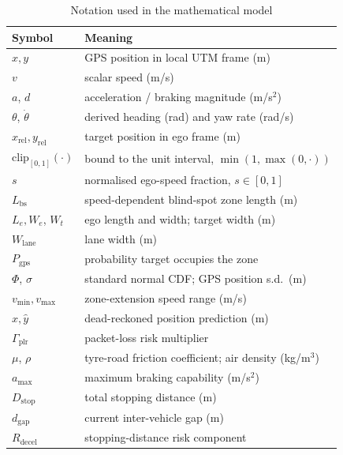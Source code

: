 \documentclass[sn-mathphys-num,Numbered,iicol]{sn-jnl}
\begin{document}
\begin{table}[htbp]
  \caption{Notation used in the mathematical model}
  \label{tab:notation}
  \renewcommand{\arraystretch}{1.12}
  \begin{tabular}{@{}ll@{}}
    \toprule
    \textbf{Symbol} & \textbf{Meaning} \\
    \midrule
    $x, y$                     & GPS position in local UTM frame (m) \\
    $v$                        & scalar speed (m/s) \\
    $a$, $d$                   & acceleration / braking magnitude (m/s$^2$) \\
    $\theta$, $\dot{\theta}$   & derived heading (rad) and yaw rate (rad/s) \\
    $x_{\mathrm{rel}}, y_{\mathrm{rel}}$ & target position in ego frame (m) \\
    $\mathrm{clip}_{[0,1]}(\cdot)$ & bound to the unit interval, $\min(1,\max(0,\cdot))$ \\
    $s$                        & normalised ego-speed fraction, $s \in [0,1]$ \\
    $L_{\mathrm{bs}}$          & speed-dependent blind-spot zone length (m) \\
    $L_e, W_e$, $W_t$          & ego length and width; target width (m) \\
    $W_{\mathrm{lane}}$        & lane width (m) \\
    $P_{\mathrm{gps}}$         & probability target occupies the zone \\
    $\Phi$, $\sigma$           & standard normal CDF; GPS position s.d.\ (m) \\
    $v_{\min}, v_{\max}$       & zone-extension speed range (m/s) \\
    $\hat{x}, \hat{y}$         & dead-reckoned position prediction (m) \\
    $\Gamma_{\mathrm{plr}}$    & packet-loss risk multiplier \\
    $\mu$, $\rho$              & tyre-road friction coefficient; air density (kg/m$^3$) \\
    $a_{\max}$                 & maximum braking capability (m/s$^2$) \\
    $D_{\mathrm{stop}}$        & total stopping distance (m) \\
    $d_{\mathrm{gap}}$         & current inter-vehicle gap (m) \\
    $R_{\mathrm{decel}}$       & stopping-distance risk component \\

\end{tabular}
\end{table}
\end{document}
